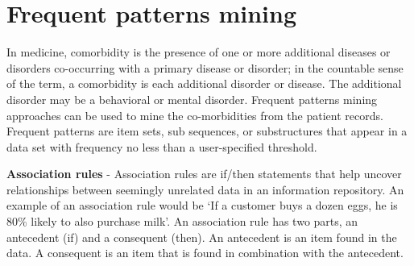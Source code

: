 \documentclass{book}
\begin{document}

%
%
%
%
%
%

\chapter{Frequent patterns mining}
In medicine, comorbidity is the presence of one or more additional diseases or disorders co-occurring with a primary disease or disorder; in the countable sense of the term, a comorbidity is each additional disorder or disease. The additional disorder may be a behavioral or mental disorder. Frequent patterns mining approaches  can be used to mine the co-morbidities from the patient records. Frequent patterns are item sets, sub sequences, or substructures that appear in a data set with frequency no less than a user-specified threshold.

\textbf{Association rules} - Association rules are if/then statements that help uncover relationships between seemingly unrelated data in an information repository. An example of an association rule would be `If a customer buys a dozen eggs, he is 80\% likely to also purchase milk'. An association rule has two parts, an antecedent (if) and a consequent (then). An antecedent is an item found in the data. A consequent is an item that is found in combination with the antecedent.
\end{document}
